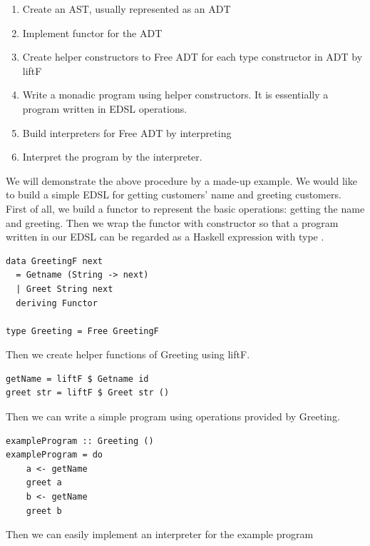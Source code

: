 \begin{enumerate}
  \item Create an AST, usually represented as an ADT
  \item Implement functor for the ADT
  \item Create helper constructors to Free ADT for each type constructor in ADT by liftF 
  \item Write a monadic program using helper constructors. It is essentially a program written in EDSL operations.
  \item Build interpreters for Free ADT by interpreting
  \item Interpret the program by the interpreter.
\end{enumerate}
We will demonstrate the above procedure by a made-up example. We would like to build a simple EDSL for getting customers' name and greeting customers. First of all, we build a functor  to represent the basic operations: getting the name and greeting. Then we wrap the functor with  constructor so that a program written in our EDSL can be regarded as a Haskell expression with type .
\begin{code}
\begin{verbatim}
data GreetingF next
  = Getname (String -> next)
  | Greet String next
  deriving Functor

type Greeting = Free GreetingF
\end{verbatim}
\end{code}
Then we create helper functions of Greeting using liftF.
\begin{verbatim}
getName = liftF $ Getname id
greet str = liftF $ Greet str ()
\end{verbatim}
Then we can write a simple program using operations provided by Greeting.
\begin{verbatim}
exampleProgram :: Greeting ()
exampleProgram = do
    a <- getName
    greet a
    b <- getName
    greet b
\end{verbatim}
Then we can easily implement an interpreter for the example program

